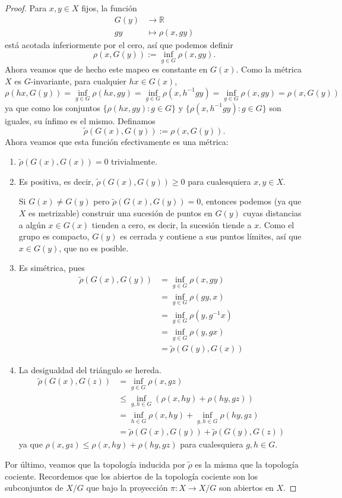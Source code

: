 \documentclass[spanish]{article}
\theoremstyle{definition}
\newcommand{\R}{\mathbb{R}}
\begin{document}
\begin{proof}
	Para $x,y\in X$ fijos, la función
	\begin{align*}
		G(y)&\to\R\\
		gy&\mapsto\rho(x,gy)
	\end{align*}
	está acotada inferiormente por el cero, así que podemos definir 
	\[\rho(x,G(y)):=\inf_{g\in G}\rho(x,gy).\]
	Ahora veamos que de hecho este mapeo es constante en $G(x)$. Como la métrica  $X$ es $G$-invariante, para cualquier $hx\in G(x)$,
	\[\rho(hx,G(y))=\inf_{g\in G}\rho(hx,gy)=\inf_{g\in G}\rho(x,h^{-1}gy)=\inf_{g\in G}\rho(x,gy)=\rho(x,G(y))\]
	ya que como los conjuntos $\{\rho(hx,gy):g\in G\}$ y $\{\rho(x,h^{-1}gy):g\in G\}$ son iguales, su ínfimo es el mismo.
	Definamos
	\[\tilde{\rho}(G(x),G(y)):=\rho(x,G(y)).\]
	Ahora veamos que esta función efectivamente es una métrica:
	\begin{enumerate}
		\item $\tilde{\rho}(G(x),G(x))=0$ trivialmente.
		
		\item Es positiva, es decir, $\tilde{\rho}(G(x),G(y))\geq0$ para cualesquiera $x,y\in X$.
		
		Si $G(x)\neq G(y)$ pero $\tilde{\rho}(G(x),G(y))=0$, entonces podemos (ya que $X$ es metrizable) construir una sucesión de puntos en $G(y)$ cuyas distancias a algún $x\in G(x)$ tienden a cero, es decir, la sucesión tiende a $x$. Como el grupo es compacto, $G(y)$ es cerrada y contiene a sus puntos límites, así que $x\in G(y)$, que no es posible.
		
		\item Es simétrica, pues
		\begin{align*}
			\tilde{\rho}(G(x),G(y))&=\inf_{g\in G}\rho(x,gy)\\
			&=\inf_{g\in G}\rho(gy,x)\\
			&=\inf_{g\in G}\rho(y,g^{-1}x)\\
			&=\inf_{g\in G}\rho(y,gx)\\
			&=\tilde{\rho}(G(y),G(x))
		\end{align*}
		
		\item La desigualdad del triángulo se hereda.
		\begin{align*}
			\tilde{\rho}(G(x),G(z))&=\inf_{g\in G}\rho(x,gz)\\
			&\leq\inf_{g,h\in G}\left(\rho(x,hy)+\rho(hy,gz)\right)\\
			&=\inf_{h\in G}\rho(x,hy)+\inf_{g,h\in G}\rho(hy,gz)\\
			&=\tilde{\rho}(G(x),G(y))+\tilde{\rho}(G(y),G(z))
		\end{align*}
		ya que $\rho(x,gz)\leq\rho(x,hy)+\rho(hy,gz)$ para cualesquiera $g,h\in G$.
	\end{enumerate}
	Por último, veamos que la topología inducida por $\tilde{\rho}$ es la misma que la topología cociente. Recordemos que los abiertos de la topología cociente son los subconjuntos de $X/G$ que bajo la proyección $\pi:X\to X/G$ son abiertos en $X$.
	

\end{proof}
\end{document}
